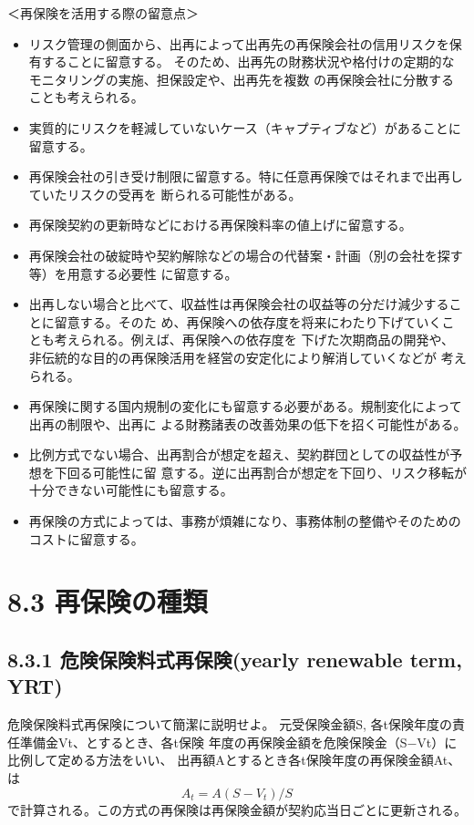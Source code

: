 \documentclass[report,gutter=10mm,fore-edge=10mm,uplatex,dvipdfmx]{jlreq}
\begin{document}
＜再保険を活用する際の留意点＞

\begin{itemize}
\item[] リスク管理の側面から、出再によって出再先の再保険会社の信用リスクを保有することに留意する。
そのため、出再先の財務状況や格付けの定期的なモニタリングの実施、担保設定や、出再先を複数
の再保険会社に分散することも考えられる。
\item[] 実質的にリスクを軽減していないケース（キャプティブなど）があることに留意する。
\item[] 再保険会社の引き受け制限に留意する。特に任意再保険ではそれまで出再していたリスクの受再を
断られる可能性がある。
\item[] 再保険契約の更新時などにおける再保険料率の値上げに留意する。
\item[] 再保険会社の破綻時や契約解除などの場合の代替案・計画（別の会社を探す等）を用意する必要性
に留意する。
\item[] 出再しない場合と比べて、収益性は再保険会社の収益等の分だけ減少することに留意する。そのた
め、再保険への依存度を将来にわたり下げていくことも考えられる。例えば、再保険への依存度を
下げた次期商品の開発や、非伝統的な目的の再保険活用を経営の安定化により解消していくなどが
考えられる。
\item[] 再保険に関する国内規制の変化にも留意する必要がある。規制変化によって出再の制限や、出再に
よる財務諸表の改善効果の低下を招く可能性がある。
\item[] 比例方式でない場合、出再割合が想定を超え、契約群団としての収益性が予想を下回る可能性に留
意する。逆に出再割合が想定を下回り、リスク移転が十分できない可能性にも留意する。
\item[] 再保険の方式によっては、事務が煩雑になり、事務体制の整備やそのためのコストに留意する。
\end{itemize}


\section{8.3 再保険の種類}
\subsection{8.3.1 危険保険料式再保険(yearly renewable term, YRT)}
危険保険料式再保険について簡潔に説明せよ。
\answer{}
元受保険金額S, 各t保険年度の責任準備金Vt、とするとき、各t保険
年度の再保険金額を危険保険金（S−Vt）に比例して定める方法をいい、
出再額Aとするとき各t保険年度の再保険金額At、は
$$
A_t=A(S−V_t)/S
$$
で計算される。この方式の再保険は再保険金額が契約応当日ごとに更新される。
\end{document}

